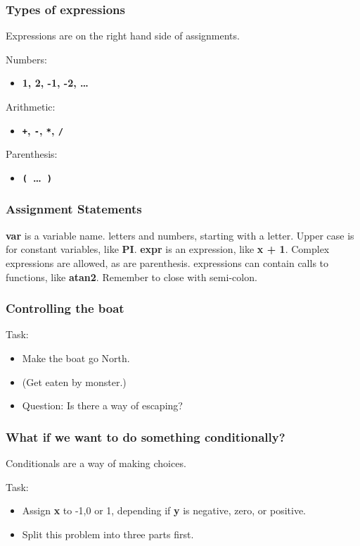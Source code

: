 \documentclass{beamer}
\begin{document}
\begin{frame}[fragile]
\frametitle{Types of expressions}
\Large

Expressions are on the right hand side of assignments.

Numbers:
\begin{itemize}
\item {\bf 1, 2, -1, -2, \ldots}
\end{itemize}

Arithmetic:
\begin{itemize}
\item {\bf \verb$+$, \verb$-$, \verb$*$, \verb$/$}
\end{itemize}

Parenthesis:
\begin{itemize}
\item {\bf \verb$($~\ldots~\verb$)$}
\end{itemize}

\end{frame}

\begin{frame}[fragile]
\frametitle{Assignment Statements}
\Large

{}

\frameskip{}
{\bf var} is a variable name. letters and numbers, starting with a letter.
Upper case is for constant variables, like {\bf PI}.
\frameskip{}
{\bf expr} is an expression, like {\bf x + 1}. Complex expressions are allowed,
as are parenthesis. expressions can contain calls to functions, like {\bf atan2}.
\frameskip{}
Remember to close with semi-colon.

\end{frame}

\begin{frame}[fragile]
\frametitle{Controlling the boat}
\Large 
Task: 
\begin{itemize}
\item Make the boat go North.
\item (Get eaten by monster.)
\end{itemize}
\frameskip{}
\frameskip{}
\begin{itemize}
\item Question: Is there a way of escaping?
\end{itemize}

\end{frame}


\begin{frame}[fragile]
\frametitle{What if we want to do something conditionally?}
\Large
Conditionals are a way of making choices.

Task: 
\begin{itemize}
\item Assign {\bf x} to -1,0 or 1, depending if {\bf y} is negative, zero, or positive.
\item Split this problem into three parts first.
\end{itemize}

\end{frame}
\end{document}
